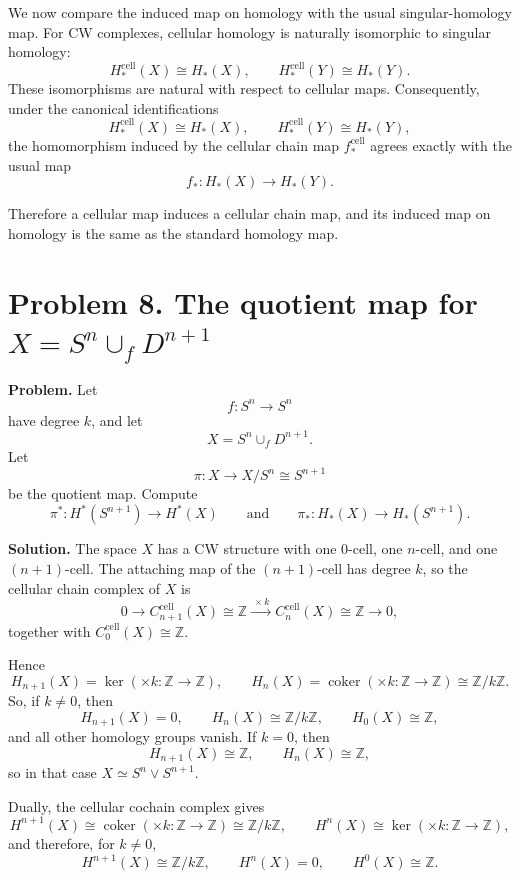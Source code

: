 \documentclass[12pt,a4paper]{article}
\theoremstyle{notespace}
\begin{document}
We now compare the induced map on homology with the usual singular-homology map. For CW complexes, cellular homology is naturally isomorphic to singular homology:
\[
H_*^{\mathrm{cell}}(X)\cong H_*(X),
\qquad
H_*^{\mathrm{cell}}(Y)\cong H_*(Y).
\]
These isomorphisms are natural with respect to cellular maps. Consequently, under the canonical identifications
\[
H_*^{\mathrm{cell}}(X)\cong H_*(X),
\qquad
H_*^{\mathrm{cell}}(Y)\cong H_*(Y),
\]
the homomorphism induced by the cellular chain map \(f_*^{\mathrm{cell}}\) agrees exactly with the usual map
\[
f_*:H_*(X)\to H_*(Y).
\]

\medskip

Therefore a cellular map induces a cellular chain map, and its induced map on homology is the same as the standard homology map.

\bigskip

\section{Problem 8. The quotient map for \(X=S^n\cup_f D^{n+1}\)}

\textbf{Problem.} Let
\[
f:S^n\to S^n
\]
have degree \(k\), and let
\[
X=S^n\cup_f D^{n+1}.
\]
Let
\[
\pi:X\to X/S^n\cong S^{n+1}
\]
be the quotient map. Compute
\[
\pi^*:H^*(S^{n+1})\to H^*(X)
\qquad\text{and}\qquad
\pi_*:H_*(X)\to H_*(S^{n+1}).
\]

\medskip

\textbf{Solution.}
The space \(X\) has a CW structure with one \(0\)-cell, one \(n\)-cell, and one \((n+1)\)-cell. The attaching map of the \((n+1)\)-cell has degree \(k\), so the cellular chain complex of \(X\) is
\[
0\longrightarrow C_{n+1}^{\mathrm{cell}}(X)\cong \mathbb Z
\xrightarrow{\ \times k\ }
C_n^{\mathrm{cell}}(X)\cong \mathbb Z
\longrightarrow 0,
\]
together with \(C_0^{\mathrm{cell}}(X)\cong \mathbb Z\).

Hence
\[
H_{n+1}(X)=\ker(\times k:\mathbb Z\to\mathbb Z),
\qquad
H_n(X)=\operatorname{coker}(\times k:\mathbb Z\to\mathbb Z)\cong \mathbb Z/k\mathbb Z.
\]
So, if \(k\neq 0\), then
\[
H_{n+1}(X)=0,
\qquad
H_n(X)\cong \mathbb Z/k\mathbb Z,
\qquad
H_0(X)\cong \mathbb Z,
\]
and all other homology groups vanish. If \(k=0\), then
\[
H_{n+1}(X)\cong \mathbb Z,
\qquad
H_n(X)\cong \mathbb Z,
\]
so in that case \(X\simeq S^n\vee S^{n+1}\).

Dually, the cellular cochain complex gives
\[
H^{n+1}(X)\cong \operatorname{coker}(\times k:\mathbb Z\to\mathbb Z)\cong \mathbb Z/k\mathbb Z,
\qquad
H^n(X)\cong \ker(\times k:\mathbb Z\to\mathbb Z),
\]
and therefore, for \(k\neq 0\),
\[
H^{n+1}(X)\cong \mathbb Z/k\mathbb Z,
\qquad
H^n(X)=0,
\qquad
H^0(X)\cong \mathbb Z.
\]
\end{document}
